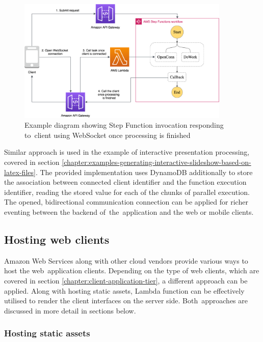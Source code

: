 \begin{figure}[h]
   \centering
   \includegraphics[width=0.9\textwidth]{assets/04-serverless-for-web-apps/asyncStepFunction.png}
   \caption{Example diagram showing Step Function invocation responding to~client using WebSocket once processing is finished}
   \label{fig:pattern-async-step-function}
\end{figure}

Similar approach is used in the example of interactive presentation processing, covered in section \ref{chapter:examples-generating-interactive-slideshow-based-on-latex-files}.
The provided implementation uses DynamoDB additionally to store the association between connected client identifier and the function execution identifier, reading the stored value for each of the chunks of parallel execution.
The opened, bidirectional communication connection can be applied for richer eventing between the backend of~the~application and the web or mobile clients.

\subsection{Hosting web clients}

Amazon Web Services along with other cloud vendors provide various ways to host the web~application clients.
Depending on the type of web clients, which are covered in section \ref{chapter:client-application-tier}, a different approach can be applied.
Along with hosting static assets, Lambda function can be effectively utilised to render the client interfaces on the server side.
Both~approaches are discussed in more detail in sections below.

\subsubsection{Hosting static assets}

